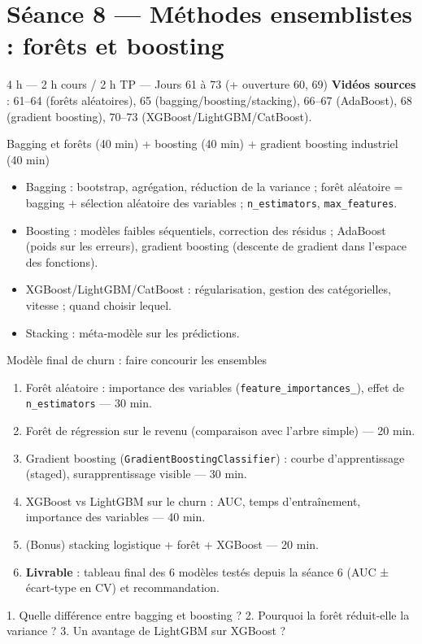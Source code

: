 \documentclass[11pt,a4paper]{article}
\begin{document}
\section*{Séance 8 — Méthodes ensemblistes : forêts et boosting}
\begin{seancebox}{4 h — 2 h cours / 2 h TP — Jours 61 à 73 (+ ouverture 60, 69)}
\textbf{Vidéos sources} : 61--64 (forêts aléatoires), 65 (bagging/boosting/stacking), 66--67 (AdaBoost), 68 (gradient boosting), 70--73 (XGBoost/LightGBM/CatBoost).
\end{seancebox}
\begin{coursbox}{Bagging et forêts (40 min) + boosting (40 min) + gradient boosting industriel (40 min)}
\begin{itemize}[nosep]
\item Bagging : bootstrap, agrégation, réduction de la variance ; forêt aléatoire = bagging + sélection aléatoire des variables ; \texttt{n\_estimators}, \texttt{max\_features}.
\item Boosting : modèles faibles séquentiels, correction des résidus ; AdaBoost (poids sur les erreurs), gradient boosting (descente de gradient dans l'espace des fonctions).
\item XGBoost/LightGBM/CatBoost : régularisation, gestion des catégorielles, vitesse ; quand choisir lequel.
\item Stacking : méta-modèle sur les prédictions.
\end{itemize}
\end{coursbox}
\begin{tpbox}{Modèle final de churn : faire concourir les ensembles}
\begin{enumerate}[nosep]
\item Forêt aléatoire : importance des variables (\texttt{feature\_importances\_}), effet de \texttt{n\_estimators} — 30 min.
\item Forêt de régression sur le revenu (comparaison avec l'arbre simple) — 20 min.
\item Gradient boosting (\texttt{GradientBoostingClassifier}) : courbe d'apprentissage (staged), surapprentissage visible — 30 min.
\item XGBoost vs LightGBM sur le churn : AUC, temps d'entraînement, importance des variables — 40 min.
\item (Bonus) stacking logistique + forêt + XGBoost — 20 min.
\item \textbf{Livrable} : tableau final des 6 modèles testés depuis la séance 6 (AUC ± écart-type en CV) et recommandation.
\end{enumerate}
\end{tpbox}
\begin{evalbox}
1. Quelle différence entre bagging et boosting ? 2. Pourquoi la forêt réduit-elle la variance ? 3. Un avantage de LightGBM sur XGBoost ?
\end{evalbox}
\end{document}
